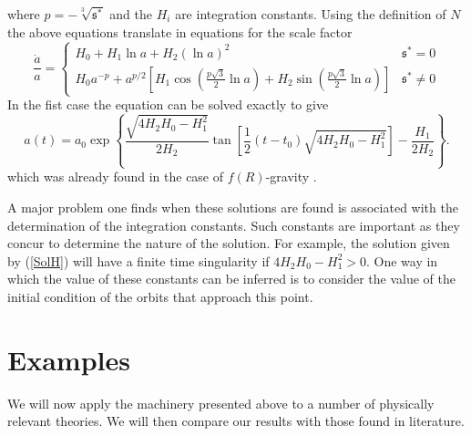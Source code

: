 \documentclass[a4paper,aps,onecolumn,nofootinbib]{revtex4}
\def\rf#1{(\ref{#1})}
\begin{document}
where $p=-\sqrt[3]{\mathfrak{s}^*}$ and the $H_i$ are integration constants. Using the definition of $N$ the above equations translate in equations for the scale factor
\begin{equation}
\frac{\dot{a}}{a}=\left\{ 
\begin{array}{ll}
H_0+H_1 \ln a+ H_2 (\ln a)^2 & \mathfrak{s}^*=0\\
H_0 a^{-p}+ a^{p/2}\left[H_1\cos \left( \frac{p\sqrt{3}}{2}\ln a\right)+ H_2 \sin \left( \frac{p\sqrt{3}}{2}\ln a\right)\right]&\mathfrak{s}^*\neq 0
\end{array}
\right.
\end{equation}
In the fist case the equation can be solved exactly to give
\begin{equation}\label{SolH}
  a(t)=a_0 \exp \left\{\frac{\sqrt{4 H_2 H_0-H_1^2}}{2 H_2} \tan \left[\frac{1}{2} (t-t_0) \sqrt{4 H_2
   H_0-H_1^2}\right]-\frac{H_1}{2 H_2}\right\}.
\end{equation}
which was already found in the case of $f(R)$-gravity \cite{Carloni:2015jla}. 

A major problem one finds when these solutions are found is 
associated with the determination of the integration constants. Such constants are important as they  
concur to determine the nature of the solution. For example, the solution given by \rf{SolH} will have a finite time singularity if $4 H_2 H_0-H_1^2>0$. One way in which the value of these constants can be inferred is to consider the value of the initial condition of the orbits that approach this point.
\section{Examples}
We will now apply the machinery presented above to a number of physically relevant theories. We will then compare our results with 
 those found in literature.
\end{document}
